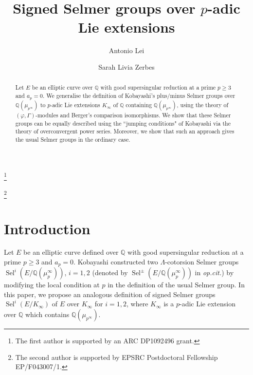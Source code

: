 \documentclass{amsart}
\newcommand{\QQ}{\mathbb Q}
\DeclareMathOperator{\Sel}{Sel}
\newcommand{\vp}{\varphi}
\begin{document}
  

\title{Signed Selmer groups over $p$-adic Lie extensions}

\author{Antonio Lei}
\address[Lei]{School of Mathematical Sciences\\
Monash University\\
Clayton, VIC 3800\\
Australia}
\thanks{The first author is supported by an ARC DP1092496 grant.}

\author{Sarah Livia Zerbes}
\address[Zerbes]{Department of Mathematics\\
  Harrison Building\\
  University of Exeter\\
  Exeter EX4 4QF, UK
}

\thanks{The second author is supported by EPSRC Postdoctoral Fellowship EP/F043007/1.}

\begin{abstract}
 Let $E$ be an elliptic curve over $\QQ$ with good supersingular reduction at a prime $p\geq 3$ and $a_p=0$. We generalise the definition of Kobayashi's plus/minus Selmer groups over $\QQ(\mu_{p^\infty})$ to $p$-adic Lie extensions $K_\infty$ of $\QQ$ containing $\QQ(\mu_{p^\infty})$, using the theory of $(\vp,\Gamma)$-modules and Berger's comparison isomorphisms. We show that these Selmer groups can be equally described using the ``jumping conditions" of Kobayashi via the theory of overconvergent power series. Moreover, we show that such an approach gives the usual Selmer groups in the ordinary case. 
\end{abstract}


\maketitle
\tableofcontents

 \section{Introduction}
 
  Let $E$ be an elliptic curve defined over $\QQ$ with good supersingular reduction at a prime $p\geq 3$ and $a_p=0$. Kobayashi \cite{kobayashi03} constructed two $\Lambda$-cotorsion Selmer groups $\Sel^i(E/\QQ(\mu_p^{\infty}))$, $i=1,2$ (denoted by $\Sel^\pm(E/\QQ(\mu_p^{\infty}))$ in \emph{op.cit.}) by modifying the local condition at $p$ in the definition of the usual Selmer group. In this paper, we propose an analogous definition of signed Selmer groups $\Sel^i(E\slash K_\infty)$ of $E$ over $K_\infty$ for $i=1,2$, where $K_\infty$ is a $p$-adic Lie extension over $\QQ$ which contains $\QQ(\mu_{p^\infty})$.
\end{document}
